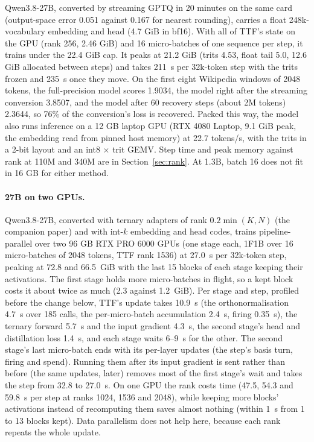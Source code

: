 \documentclass[10pt,twocolumn]{article}
\begin{document}
Qwen3.8-27B, converted by streaming GPTQ \citep{frantar2023gptq} in 20 minutes on the same card (output-space error 0.051
against 0.167 for nearest rounding), carries a float 248k-vocabulary embedding and head (4.7 GiB in bf16). With all of
TTF's state on the GPU (rank 256, 2.46 GiB) and 16 micro-batches of one sequence per step, it trains under the 22.4 GiB
cap. It peaks at 21.2 GiB (trits 4.53, float tail 5.0, 12.6 GiB allocated between steps) and takes 211~s per 32k-token
step with the trits frozen and 235~s once they move. On the first eight Wikipedia windows of 2048 tokens, the
full-precision model scores 1.9034, the model right after the streaming conversion 3.8507, and the model after 60
recovery steps (about 2M tokens) 2.3644, so 76\% of the conversion's loss is recovered. Packed this way, the model also
runs inference on a 12 GB laptop GPU (RTX 4080 Laptop, 9.1 GiB peak, the embedding read from pinned host memory) at
22.7 tokens/s, with the trits in a 2-bit layout and an int8 $\times$ trit GEMV. Step time and peak memory against rank
at 110M and 340M are in Section~\ref{sec:rank}. At 1.3B, batch 16 does not fit in 16 GB for either method.

\paragraph{27B on two GPUs.} Qwen3.8-27B, converted with ternary adapters of rank $0.2\min(K,N)$ (the companion
paper) and with int-$k$ embedding and head codes, trains pipeline-parallel over two 96 GB RTX PRO 6000 GPUs (one stage
each, 1F1B over 16 micro-batches of 2048 tokens, TTF rank 1536) at 27.0~s per 32k-token step, peaking at 72.8 and
66.5~GiB with the last 15 blocks of each stage keeping their activations. The first stage holds more micro-batches in
flight, so a kept block costs it about twice as much (2.3 against 1.2~GiB). Per stage and step, profiled before the
change below, TTF's update takes
10.9~s (the orthonormalisation 4.7~s over 185 calls, the per-micro-batch accumulation 2.4~s, firing 0.35~s), the
ternary forward 5.7~s and the input gradient 4.3~s, the second stage's head and distillation loss 1.4~s, and each
stage waits 6--9~s for the other. The second stage's last micro-batch ends with its per-layer updates (the step's basis
turn, firing and spend). Running them after its input gradient is sent rather than before (the same updates, later)
removes most of the first stage's wait and takes the step from 32.8 to 27.0~s. On one GPU the rank costs time (47.5,
54.3 and 59.8~s per step at ranks 1024, 1536 and 2048), while keeping more blocks' activations instead of recomputing
them saves almost nothing (within 1~s from 1 to 13 blocks kept). Data parallelism does not help here, because each rank
repeats the whole update.
\end{document}
